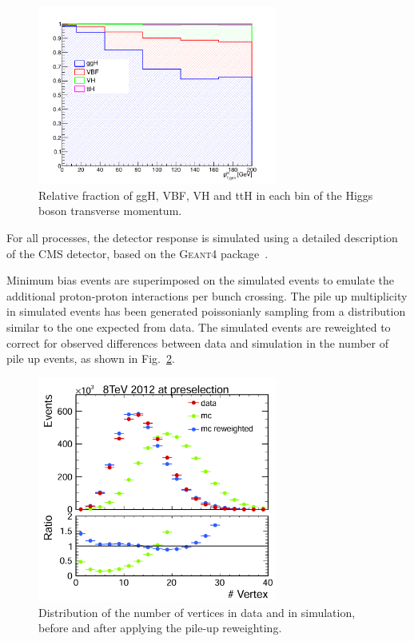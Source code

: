 \begin{figure}[htb]
\centering
\includegraphics[width=0.7\textwidth]{images/signal_composition_ttH.pdf}
\caption{Relative fraction of ggH, VBF, VH and ttH in each bin of the Higgs boson transverse momentum.}\label{fig:signal_comp}
\end{figure}

For all processes, the detector response is simulated using a detailed description of the CMS detector, based on the \textsc{Geant4} package~\cite{Agostinelli:2002hh}.

Minimum bias events are superimposed on the simulated events to emulate the additional 
proton-proton interactions per bunch crossing. The pile up multiplicity in simulated events has been generated poissonianly sampling from a distribution similar to the one expected from data.
The simulated events are reweighted to correct for observed differences between data and simulation in the number of pile up events, as shown in Fig.~\ref{fig:nvertices}.

\begin{figure}[htb]
\centering
\includegraphics[width=0.7\textwidth]{images/nvertex.pdf}
\caption{Distribution of the number of vertices in data and in simulation, before and after applying the pile-up reweighting.}\label{fig:nvertices}
\end{figure}

